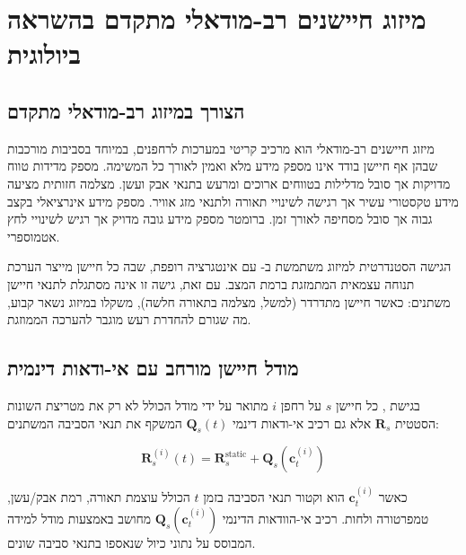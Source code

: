 

\section{מיזוג חיישנים רב-מודאלי מתקדם בהשראה ביולוגית}
\label{sec:ch05_advanced_fusion}

\subsection{הצורך במיזוג רב-מודאלי מתקדם}
\label{sec:ch05_motivation}

מיזוג חיישנים רב-מודאלי הוא מרכיב קריטי במערכות  לרחפנים, במיוחד בסביבות  מורכבות שבהן אף חיישן בודד אינו מספק מידע מלא ואמין לאורך כל המשימה.  מספק מדידות טווח מדויקות אך סובל מדלילות בטווחים ארוכים ומרעש בתנאי אבק ועשן. מצלמה חזותית מציעה מידע טקסטורי עשיר אך רגישה לשינויי תאורה ולתנאי מזג אוויר.  מספק מידע אינרציאלי בקצב גבוה אך סובל מסחיפה לאורך זמן. ברומטר מספק מידע גובה מדויק אך רגיש לשינויי לחץ אטמוספרי.

הגישה הסטנדרטית למיזוג משתמשת ב- עם אינטגרציה רופפת, שבה כל חיישן מייצר הערכת תנוחה עצמאית המתמזגת ברמת המצב. עם זאת, גישה זו אינה מסתגלת לתנאי חיישן משתנים: כאשר חיישן מתדרדר (למשל, מצלמה בתאורה חלשה), משקלו במיזוג נשאר קבוע, מה שגורם להחדרת רעש מוגבר להערכה הממוזגת.

\subsection{מודל חיישן מורחב עם אי-ודאות דינמית}
\label{sec:ch05_extended_sensor_model}

בגישת , כל חיישן $s$ על רחפן $i$ מתואר על ידי מודל הכולל לא רק את מטריצת השונות הסטטית $\mathbf{R}_{s}$ אלא גם רכיב אי-ודאות דינמי $\mathbf{Q}_{s}(t)$ המשקף את תנאי הסביבה המשתנים:

\begin{equation}
\mathbf{R}_{s}^{(i)}(t) = \mathbf{R}_{s}^{\text{static}} + \mathbf{Q}_{s}(\mathbf{c}_{t}^{(i)})
\label{eq:ch05_dynamic_covariance}
\end{equation}

כאשר $\mathbf{c}_{t}^{(i)}$ הוא וקטור תנאי הסביבה בזמן $t$ הכולל עוצמת תאורה, רמת אבק/עשן, טמפרטורה ולחות. רכיב אי-הוודאות הדינמי $\mathbf{Q}_{s}(\mathbf{c}_{t}^{(i)})$ מחושב באמצעות מודל למידה המבוסס על נתוני כיול שנאספו בתנאי סביבה שונים.

